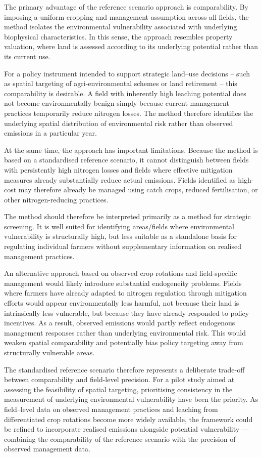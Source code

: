 \documentclass[12pt]{article}
\begin{document}
The primary advantage of the reference scenario approach is comparability. 
By imposing a uniform cropping and management assumption across all fields, the method isolates the environmental vulnerability associated with underlying biophysical characteristics. 
In this sense, the approach resembles property valuation, where land is assessed according to its underlying potential rather than its current use.

For a policy instrument intended to support strategic land--use decisions -- such as spatial targeting of agri-environmental schemes or land retirement -- this comparability is desirable. 
A field with inherently high leaching potential does not become environmentally benign simply because current management practices temporarily reduce nitrogen losses. 
The method therefore identifies the underlying spatial distribution of environmental risk rather than observed emissions in a particular year.

At the same time, the approach has important limitations. 
Because the method is based on a standardised reference scenario, it cannot distinguish between fields with persistently high nitrogen losses and fields where effective mitigation measures already substantially reduce actual emissions. Fields identified as high-cost may therefore already be managed using catch crops, reduced fertilisation, or other nitrogen-reducing practices.

The method should therefore be interpreted primarily as a method for strategic screening. 
It is well suited for identifying areas/fields where environmental vulnerability is structurally high, but less suitable as a standalone basis for regulating individual farmers without supplementary information on realised management practices.

An alternative approach based on observed crop rotations and field-specific management would likely introduce substantial endogeneity problems. 
Fields where farmers have already adapted to nitrogen regulation through mitigation efforts would appear environmentally less harmful, not because their land is intrinsically less vulnerable, but because they have already responded to policy incentives. 
As a result, observed emissions would partly reflect endogenous management responses rather than underlying environmental risk. This would weaken spatial comparability and potentially bias policy targeting away from structurally vulnerable areas.

The standardised reference scenario therefore represents a deliberate trade-off between comparability and field-level precision. 
For a pilot study aimed at assessing the feasibility of spatial targeting, prioritising consistency in the measurement of underlying environmental vulnerability have been the priority. 
As field--level data on observed management practices and leaching from differentiated crop rotations become more widely available, the framework could be refined to incorporate realised emissions alongside potential vulnerability --- combining the comparability of the reference scenario with the precision of observed management data.
\end{document}
